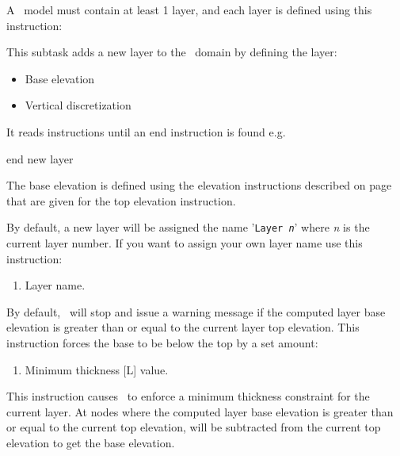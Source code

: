 A \mfus\ model must contain at least 1 layer, and each layer is defined using this instruction:     {

    {This subtask adds a new layer to the \gwf\ domain by defining the layer:
     \begin{itemize}
       \item Base elevation
       \item Vertical discretization
     \end{itemize}

     It reads instructions until an \textsf{end} instruction is found e.g.\:

    {\Large \sf end new layer}
    }

The base elevation is defined using the elevation instructions  described on page~\pageref{'Page:TopElev'} that are given for the \textsf{top elevation} instruction.

By default, a new layer will be assigned the name '\texttt{Layer {\em n}}' where {\em n} is the current layer number.  If you want to assign your own layer name use this instruction:

    {
    \squish
    \begin{enumerate}
    \item {} Layer name.
    \end{enumerate}
    \squish
    }




By default, \mut\ will stop and issue a warning message if the computed layer base elevation is greater than or equal to the current layer top elevation.  This instruction forces the base to be below the top by a set amount:

    {\squish
    \begin{enumerate}
    \item {} Minimum thickness [L] value.
    \end{enumerate}
    This instruction causes \mut\ to enforce a minimum thickness constraint for the current layer. At nodes where the computed layer base elevation is greater than or equal to the current top elevation,  will
    be subtracted from the current top elevation to get the base elevation.
    }

}
